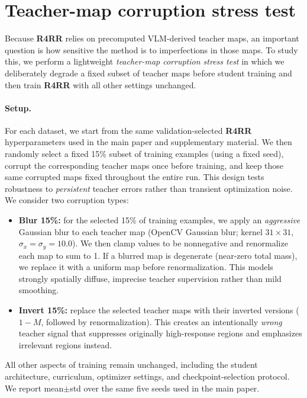\documentclass[10pt,twocolumn,letterpaper]{article}
\begin{document}
\section{Teacher-map corruption stress test}
\label{appendix:teacher_map_corruption}

Because \textbf{R4RR} relies on precomputed VLM-derived teacher maps, an important question is how sensitive the method is to imperfections in those maps. To study this, we perform a lightweight \emph{teacher-map corruption stress test} in which we deliberately degrade a fixed subset of teacher maps before student training and then train \textbf{R4RR} with all other settings unchanged.

\paragraph{Setup.}
For each dataset, we start from the same validation-selected \textbf{R4RR} hyperparameters used in the main paper and supplementary material. We then randomly select a fixed 15\% subset of training examples (using a fixed seed), corrupt the corresponding teacher maps once before training, and keep those same corrupted maps fixed throughout the entire run. This design tests robustness to \emph{persistent} teacher errors rather than transient optimization noise. We consider two corruption types:

\begin{itemize}
    \item \textbf{Blur 15\%:} for the selected 15\% of training examples, we apply an \emph{aggressive} Gaussian blur to each teacher map (OpenCV Gaussian blur; kernel \(31\times31\), \(\sigma_x=\sigma_y=10.0\)). We then clamp values to be nonnegative and renormalize each map to sum to 1. If a blurred map is degenerate (near-zero total mass), we replace it with a uniform map before renormalization. This models strongly spatially diffuse, imprecise teacher supervision rather than mild smoothing.
    \item \textbf{Invert 15\%:} replace the selected teacher maps with their inverted versions ($1-M$, followed by renormalization). This creates an intentionally \emph{wrong} teacher signal that suppresses originally high-response regions and emphasizes irrelevant regions instead.
\end{itemize}

All other aspects of training remain unchanged, including the student architecture, curriculum, optimizer settings, and checkpoint-selection protocol. We report mean$\pm$std over the same five seeds used in the main paper.
\end{document}

